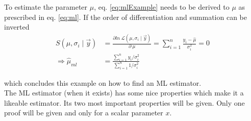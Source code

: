 \documentclass[report,12pt]{report}
\begin{document}
To estimate the parameter $\mu$, eq. \ref{eq:mlExample} needs to be derived to $\mu$ as prescribed in eq. \ref{eq:ml}. If the order of differentiation and summation can be inverted
\begin{align}
	S\left(\mu, \sigma_i \mid \vec y \right) &=
	\frac{\partial ln\ \mathcal{L} \left(\mu, \sigma_i \mid \vec y \right)}
	{\partial\ \mu}
	= \sum_{i=1}^{n} \frac{y_i-\hat\mu}{\sigma_i^2} = 0
	\nonumber\\
	\Rightarrow \hat\mu_{ml} &= \frac
	{\sum_{i=1}^{n} y_i / \sigma_i^2}
	{\sum_{i=1}^{n} 1/\sigma_i^2}
\end{align}

which concludes this example on how to find an ML estimator.\\

The ML estimator (when it exists) has some nice properties which make it a likeable estimator. Its two most important properties will be given. Only one proof will be given and only for a scalar parameter $x$.
\end{document}
